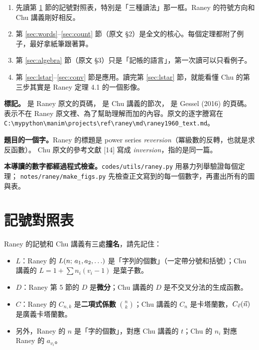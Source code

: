 \begin{keybox}[建議的讀法]
\begin{enumerate}[leftmargin=1.6em]
  \item 先讀第 \ref{sec:notation} 節的記號對照表，特別是「三種讀法」那一框。Raney 的符號方向和 Chu 講義剛好相反。
  \item 第 \ref{sec:words}--\ref{sec:count} 節（原文 §2）是全文的核心。每個定理都附了例子，最好拿紙筆跟著算。
  \item 第 \ref{sec:algebra} 節（原文 §3）只是「記帳的語言」，第一次讀可以只看例子。
  \item 第 \ref{sec:lstar}--\ref{sec:conv} 節是應用。讀完第 \ref{sec:lstar} 節，就能看懂 Chu 的第三步其實是 Raney 定理 4.1 的一個影像。
\end{enumerate}
\end{keybox}

\textbf{標記。} 是 Raney 原文的頁碼， 是 Chu 講義的節次， 是 Gessel (2016) 的頁碼。
\extra{} 表示不在 Raney 原文裡、為了幫助理解而加的內容。原文的逐字謄寫在
\texttt{C:\textbackslash mypython\textbackslash manim\textbackslash projects\textbackslash ref\textbackslash raney\textbackslash md\textbackslash raney1960\_text.md}。

\textbf{題目的一個字。}Raney 的標題是 power series \emph{reversion}（冪級數的反轉，也就是求反函數）。
Chu 原文的參考文獻 [14] 寫成 \emph{inversion}，指的是同一篇。

\textbf{本導讀的數字都經過程式檢查。}\nolinkurl{codes/utils/raney.py} 用暴力列舉驗證每個定理；
\nolinkurl{notes/raney/make_figs.py} 先檢查正文寫到的每一個數字，再畫出所有的圖與表。

\section{記號對照表}\label{sec:notation}

Raney 的記號和 Chu 講義有三處\textbf{撞名}，請先記住：
\begin{notebox}[撞名警告]
\begin{itemize}[leftmargin=1.4em]
  \item $L$：Raney 的 $L(n;\,a_1,a_2,\ldots)$ 是「字列的個數」（一定帶分號和括號）；Chu 講義的 $L=1+\sum n_i(v_i-1)$ 是葉子數。
  \item $D$：Raney 第 5 節的 $D$ 是\textbf{微分}；Chu 講義的 $D$ 是不交叉分法的生成函數。
  \item $C$：Raney 的 $C_{n,k}$ 是\textbf{二項式係數} $\binom nk$；Chu 講義的 $C_n$ 是卡塔蘭數，$C_{\vec v}(\vec n)$ 是廣義卡塔蘭數。
  \item 另外，Raney 的 $n$ 是「字的個數」，對應 Chu 講義的 $t$；Chu 的 $n_i$ 對應 Raney 的 $a_{v_i}$。
\end{itemize}
\end{notebox}

